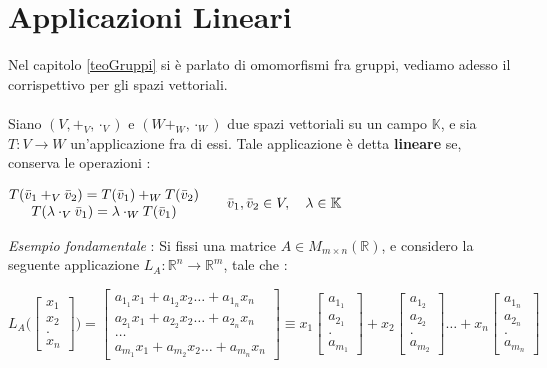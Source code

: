 \documentclass[12pt, letterpaper]{article}
\newcommand{\R}{{\mathbb R}}
\newcommand{\ve}{{\bar v}}
\newcommand{\acc}{\\\hphantom{}\\}
\begin{document}
\section{Applicazioni Lineari}
Nel capitolo \ref{teoGruppi} si è parlato di omomorfismi fra gruppi, vediamo adesso il corrispettivo 
per gli spazi vettoriali.\acc 
Siano \((V,+_V,\cdot_V)\) e  \((W+_W,\cdot_W)\) due spazi vettoriali su un campo \(\mathbb{K}\), e sia \(T:V\rightarrow W\) un'applicazione fra di essi.
Tale applicazione è detta \textbf{lineare} se, conserva le operazioni : \begin{center}
    \(\begin{matrix}T(\ve_1+_V\ve_2)=T(\ve_1)+_W T(\ve_2)\\
        T(\lambda \cdot_V \ve_1)=\lambda \cdot_W T(\ve_1)
    \end{matrix}\text{\hphantom{aaaa}} \ve_1,\ve_2\in V,\text{\hphantom{aa}} \lambda \in \mathbb{K}\)
\end{center}
\textit{Esempio fondamentale} : Si fissi una matrice \(A\in M_{m\times n}(\R)\), e considero la seguente 
applicazione \(L_A : \R^n\rightarrow \R^m\), tale che : \begin{center}
    \(
    L_A\Bigg(\begin{bmatrix}
        x_1\\x_2\\.\\x_n
    \end{bmatrix}\Bigg)  =\begin{bmatrix}
        a_{1_1}x_1+a_{1_2}x_2\dots+a_{1_n}x_n\\
        a_{2_1}x_1+a_{2_2}x_2\dots+a_{2_n}x_n\\\dots \\
        a_{m_1}x_1+a_{m_2}x_2\dots+a_{m_n}x_n
    \end{bmatrix} \equiv x_1 \begin{bmatrix}
        a_{1_1}\\ a_{2_1}\\.\\a_{m_1}
    \end{bmatrix} +x_2 \begin{bmatrix}
        a_{1_2}\\ a_{2_2}\\.\\a_{m_2}
    \end{bmatrix} \dots +x_n \begin{bmatrix}
        a_{1_n}\\ a_{2_n}\\.\\a_{m_n}
    \end{bmatrix} 
    \)
\end{center}
\end{document}
